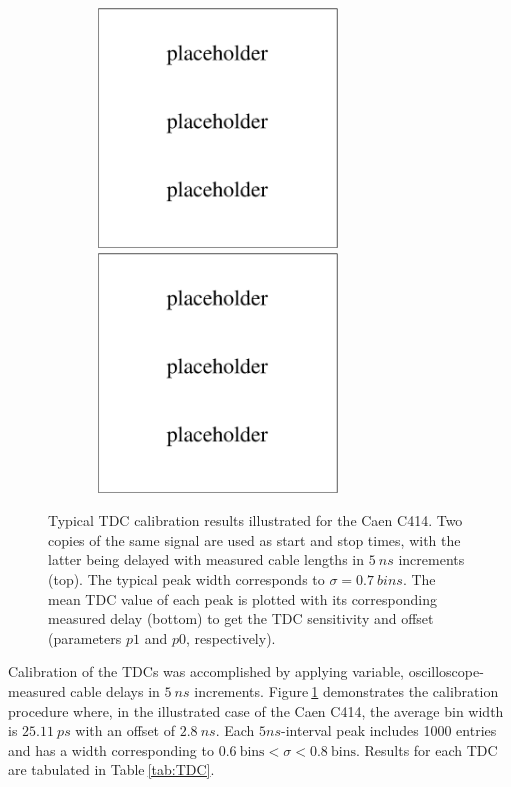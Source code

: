 \begin{figure}[]
\centering
\includegraphics[width=0.8\textwidth, height=2.5in]{evan/fig_evan_tdc_testing/placeholder.eps} %
\includegraphics[width=0.8\textwidth, height=2.5in]{evan/fig_evan_tdc_testing/placeholder.eps} %
\caption{Typical TDC calibration results illustrated for the Caen C414. Two copies of the same signal are used as start and stop times, with the latter being delayed with measured cable lengths in $5\:ns$ increments (top). The typical peak width corresponds to $\sigma=0.7\:bins$. The mean TDC value of each peak is plotted with its corresponding measured delay (bottom) to get the TDC sensitivity and offset (parameters $p1$ and $p0$, respectively).\label{fig:tdcDelays}}
\end{figure}

Calibration of the TDCs was accomplished by applying variable, oscilloscope-measured cable delays in $5\:ns$ increments. Figure$\:$\ref{fig:tdcDelays} demonstrates the calibration procedure where, in the illustrated case of the Caen C414, the average bin width is $25.11\:ps$ with an offset of $2.8\:ns$. Each $5ns$-interval peak includes 1000 entries and has a width corresponding to $0.6\:\textrm{bins}<\sigma<0.8\:\textrm{bins}$. Results for each TDC are tabulated in Table$\:$\ref{tab:TDC}.

